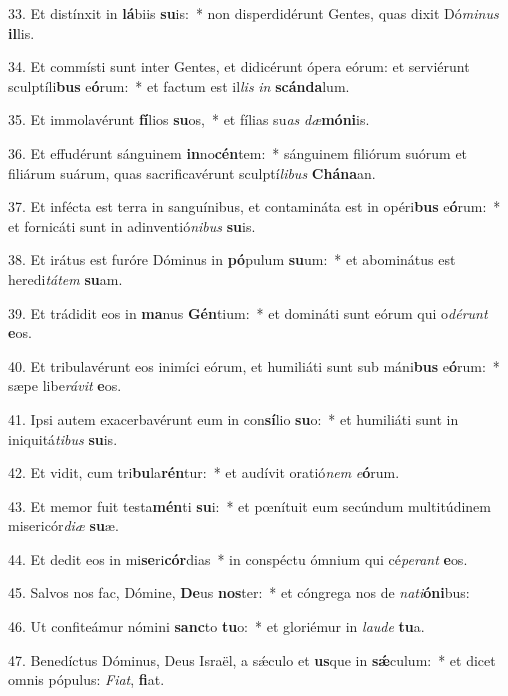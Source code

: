 33. Et distínxit in \textbf{lá}biis \textbf{su}is:~*  non disperdidérunt Gentes, quas dixit Dó\textit{mi}\textit{nus} \textbf{il}lis.\

34. Et commísti sunt inter Gentes, et didicérunt ópera eórum: et serviérunt sculptíli\textbf{bus} e\textbf{ó}rum:~*  et factum est il\textit{lis} \textit{in} \textbf{scán}\textbf{da}lum.\

35. Et immolavérunt \textbf{fí}lios \textbf{su}os,~*  et fílias su\textit{as} \textit{dæ}\textbf{mó}\textbf{ni}is.\

36. Et effudérunt sánguinem \textbf{in}no\textbf{cén}tem:~*  sánguinem filiórum suórum et filiárum suárum, quas sacrificavérunt sculptí\textit{li}\textit{bus} \textbf{Chá}\textbf{na}an.\

37. Et infécta est terra in sanguínibus, et contamináta est in opéri\textbf{bus} e\textbf{ó}rum:~*  et fornicáti sunt in adinventió\textit{ni}\textit{bus} \textbf{su}is.\

38. Et irátus est furóre Dóminus in \textbf{pó}pulum \textbf{su}um:~*  et abominátus est heredi\textit{tá}\textit{tem} \textbf{su}am.\

39. Et trádidit eos in \textbf{ma}nus \textbf{Gén}tium:~*  et domináti sunt eórum qui o\textit{dé}\textit{runt} \textbf{e}os.\

40. Et tribulavérunt eos inimíci eórum, et humiliáti sunt sub máni\textbf{bus} e\textbf{ó}rum:~*  sæpe libe\textit{rá}\textit{vit} \textbf{e}os.\

41. Ipsi autem exacerbavérunt eum in con\textbf{sí}lio \textbf{su}o:~*  et humiliáti sunt in iniquitá\textit{ti}\textit{bus} \textbf{su}is.\

42. Et vidit, cum tri\textbf{bu}la\textbf{rén}tur:~*  et audívit oratió\textit{nem} \textit{e}\textbf{ó}rum.\

43. Et memor fuit testa\textbf{mén}ti \textbf{su}i:~*  et pœnítuit eum secúndum multitúdinem misericór\textit{di}\textit{æ} \textbf{su}æ.\

44. Et dedit eos in mi\textbf{se}ri\textbf{cór}dias~*  in conspéctu ómnium qui cé\textit{pe}\textit{rant} \textbf{e}os.\

45. Salvos nos fac, Dómine, \textbf{De}us \textbf{nos}ter:~*  et cóngrega nos de \textit{na}\textit{ti}\textbf{ó}\textbf{ni}bus:\

46. Ut confiteámur nómini \textbf{sanc}to \textbf{tu}o:~*  et gloriémur in \textit{lau}\textit{de} \textbf{tu}a.\

47. Benedíctus Dóminus, Deus Israël, a sǽculo et \textbf{us}que in \textbf{sǽ}culum:~*  et dicet omnis pópulus: \textit{Fi}\textit{at}, \textbf{fi}at.\

